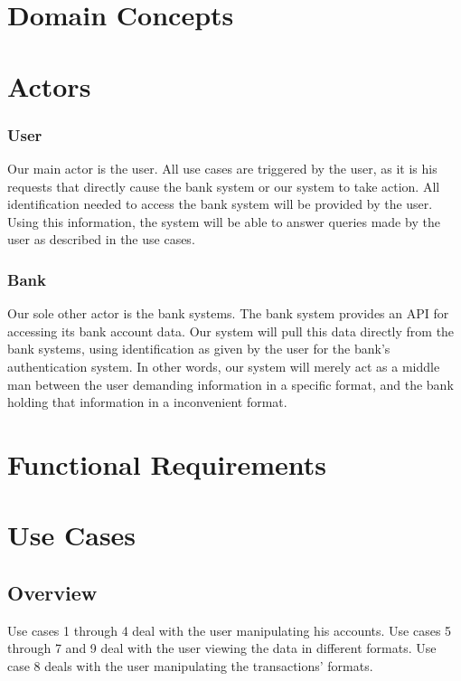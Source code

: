 \documentclass[11pt]{article}
\newcounter{use case ID}
\begin{document}
\section{Domain Concepts}




\clearpage
\section{Actors}
\subsubsection{User}
Our main actor is the user. All use cases are triggered by the user, as it is his requests that directly cause the bank system or our system to take action. All identification needed to access the bank system will be provided by the user. Using this information, the system will be able to answer queries made by the user as described in the use cases.
\subsubsection{Bank}
Our sole other actor is the bank systems. The bank system provides an API for accessing its bank account data. Our system will pull this data directly from the bank systems, using identification as given by the user for the bank's authentication system. In other words, our system will merely act as a middle man between the user demanding information in a specific format, and the bank holding that information in a inconvenient format.

\section{Functional Requirements}

\section{Use Cases}
\subsection{Overview}
Use cases 1 through 4 deal with the user manipulating his accounts. Use cases 5 through 7 and 9 deal with the user viewing the data in different formats. Use case 8 deals with the user manipulating the transactions' formats.
\end{document}
